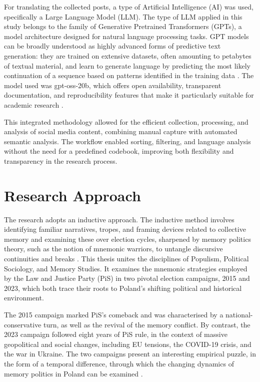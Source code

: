 \pagebreak 

For translating the collected posts, a type of Artificial Intelligence (AI) was used, specifically a Large Language Model (LLM). The type of LLM applied in this study belongs to the family of Generative Pretrained Transformers (GPTs), a model architecture designed for natural language processing tasks. GPT models can be broadly understood as highly advanced forms of predictive text generation: they are trained on extensive datasets, often amounting to petabytes of textual material, and learn to generate language by predicting the most likely continuation of a sequence based on patterns identified in the training data \citep{bubeck_sparks_2023}. The model used was gpt-oss-20b, which offers open availability, transparent documentation, and reproducibility features that make it particularly suitable for academic research \citep{openai_oai_gpt-oss_model_card_2025}. 

This integrated methodology allowed for the efficient collection, processing, and analysis of social media content, combining manual capture with automated semantic analysis. The workflow enabled sorting, filtering, and language analysis without the need for a predefined codebook, improving both flexibility and transparency in the research process.

\section{Research Approach}

The research adopts an inductive approach. The inductive method involves identifying familiar narratives, tropes, and framing devices related to collective memory and examining these over election cycles, sharpened by memory politics theory, such as the notion of mnemonic warriors, to untangle discursive continuities and breaks \citep{day_finding_2019}. This thesis unites the disciplines of Populism, Political Sociology, and Memory Studies. It examines the mnemonic strategies employed by the Law and Justice Party (PiS) in two pivotal election campaigns, 2015 and 2023, which both trace their roots to Poland's shifting political and historical environment.

The 2015 campaign marked PiS's comeback and was characterised by a national-conservative turn, as well as the revival of the memory conflict. By contrast, the 2023 campaign followed eight years of PiS rule, in the context of massive geopolitical and social changes, including EU tensions, the COVID-19 crisis, and the war in Ukraine. The two campaigns present an interesting empirical puzzle, in the form of a temporal difference, through which the changing dynamics of memory politics in Poland can be examined \citep{day_finding_2019}.

